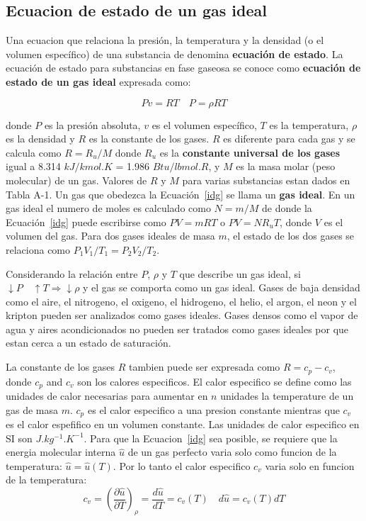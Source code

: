 \documentclass[10pt, oneside]{article}
\begin{document}
\subsection{Ecuacion de estado de un gas ideal}
Una ecuacion  que relaciona la presi\'on, la temperatura y la densidad (o el volumen espec\'ifico) de una substancia de denomina \textbf{ecuaci\'on de estado}. La ecuaci\'on de estado para substancias en fase gaseosa se conoce como \textbf{ecuaci\'on de estado de un gas ideal} expresada como:

\begin{equation}
Pv=RT  \quad P=\rho R T
\label{idg}
\end{equation}

donde $P$ es la presi\'on absoluta, $v$ es el volumen espec\'ifico, $T$ es la temperatura, $\rho$ es la densidad y $R$ es la constante de los gases. $R$ es diferente para cada gas y se calcula como $R=R_u /M$ donde $R_u$ es la \textbf{constante universal de los gases} igual a 8.314 $kJ/kmol.K$ = 1.986 $Btu/lbmol.R$, y $M$ es la masa molar (peso molecular) de un gas. Valores de $R$ y $M$ para varias substancias estan dados en Tabla A-1. Un gas que obedezca la Ecuaci\'on~\ref{idg} se llama un \textbf{gas ideal}. En un gas ideal el numero de moles es calculado como $N=m/M$ de donde la Ecuaci\'on~\ref{idg} puede escribirse como $PV=mRT$ o $PV=NR_u T$, donde $V$ es el volumen del gas. Para dos gases ideales de masa $m$, el estado de los dos gases se relaciona como $P_1 V_1 / T_1 = P_2 V_2 / T_2$. 

Considerando la relaci\'on entre $P$, $\rho$ y $T$ que describe un gas ideal, si $\downarrow P \quad \uparrow T \Rightarrow \downarrow \rho$ y el gas se comporta como un gas ideal. Gases de baja densidad como el aire, el nitrogeno, el oxigeno, el hidrogeno, el helio, el argon, el neon y el kripton pueden ser analizados como gases ideales. Gases densos como el vapor de agua y aires acondicionados no pueden ser tratados como gases ideales por que estan cerca a un estado de saturaci\'on.

La constante de los gases $R$ tambien puede ser expresada como $R=c_p - c_v$, donde $c_p$ and $c_v$ son los calores especificos. El calor especifico se define como las unidades de calor necesarias para aumentar en $n$ unidades la temperature de un gas de masa $m$. $c_p$ es el calor especifico a una presion constante mientras que $c_v$ es el calor espefifico en un volumen constante. Las unidades de calor especifico en SI son $J.kg^{-1}.K^{-1}$. Para que la Ecuacion~\ref{idg} sea posible, se requiere que la energia molecular interna $\hat{u}$ de un gas perfecto varia solo como funcion de la temperatura: $\hat{u}=\hat{u}(T)$. Por lo tanto el calor especifico $c_v$ varia solo en funcion de la temperatura:
$$
c_v=\left( \frac{\partial \hat{u}}{\partial T}\right)_{\rho} = \frac{d \hat{u}}{dT}=c_v (T) \quad d\hat{u} = c_v (T)dT
$$
\end{document}
